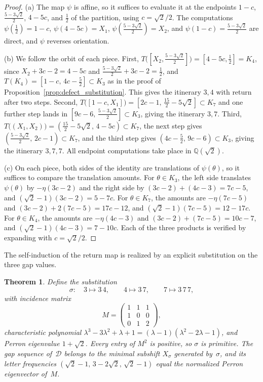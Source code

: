 \documentclass{birkjour}
\newtheorem{theorem}{Theorem}
\theoremstyle{definition}
\theoremstyle{remark}
\begin{document}
\begin{proof}
(a) The map $\psi$ is affine, so it suffices to evaluate it
at the endpoints $1-c$, $\tfrac{5-3\sqrt{2}}{2}$, $4-5c$,
and $\tfrac{1}{2}$ of the partition, using $c=\sqrt{2}/2$.
The computations
$\psi(\tfrac12)=1-c$, $\psi(4-5c)=X_{1}$,
$\psi(\tfrac{5-3\sqrt{2}}{2})=X_{2}$, and
$\psi(1-c)=\tfrac{5-3\sqrt{2}}{2}$
are direct, and $\psi$ reverses orientation.

(b) We follow the orbit of each piece. First,
$T\bigl([X_{2},\tfrac{5-3\sqrt{2}}{2}]\bigr)
=[4-5c,\tfrac12]=K_{4}$, since
$X_{2}+3c-2=4-5c$ and $\tfrac{5-3\sqrt{2}}{2}+3c-2=\tfrac12$,
and $T(K_{4})=[1-c,\,4c-\tfrac52]\subset K_{3}$ as in the
proof of Proposition~\ref{prop:defect_substitution}. This
gives the itinerary $3,4$ with return after two steps.
Second,
$T\bigl([1{-}c,X_{1}]\bigr)=[2c-1,\,\tfrac{15}{2}-5\sqrt{2}]
\subset K_{7}$ and one further step lands in
$[9c-6,\,\tfrac{5-3\sqrt{2}}{2}]\subset K_{3}$, giving the
itinerary $3,7$. Third,
$T\bigl((X_{1},X_{2})\bigr)
=(\tfrac{15}{2}-5\sqrt{2},\,4-5c)\subset K_{7}$, the next
step gives $(\tfrac{5-3\sqrt{2}}{2},\,2c-1)\subset K_{7}$,
and the third step gives
$(4c-\tfrac52,\,9c-6)\subset K_{3}$, giving the itinerary
$3,7,7$. All endpoint computations take place in
$\mathbb{Q}(\sqrt{2})$.

(c) On each piece, both sides of the identity are
translations of $\psi(\theta)$, so it suffices to compare
the translation amounts. For $\theta\in K_{3}$, the left
side translates $\psi(\theta)$ by $-\eta(3c-2)$ and the
right side by $(3c-2)+(4c-3)=7c-5$, and
$(\sqrt{2}-1)(3c-2)=5-7c$. For $\theta\in K_{7}$, the
amounts are $-\eta(7c-5)$ and $(3c-2)+2(7c-5)=17c-12$,
and $(\sqrt{2}-1)(7c-5)=12-17c$. For $\theta\in K_{4}$, the
amounts are $-\eta(4c-3)$ and $(3c-2)+(7c-5)=10c-7$, and
$(\sqrt{2}-1)(4c-3)=7-10c$. Each of the three products is
verified by expanding with $c=\sqrt{2}/2$.
\end{proof}

The self-induction of the return map is realized by an
explicit substitution on the three gap values.

\begin{theorem}\label{thm:defect_subst}
Define the substitution
\begin{equation}\label{eq:sigma}
  \sigma\colon\quad
  3\mapsto 3\,4,\qquad
  4\mapsto 3\,7,\qquad
  7\mapsto 3\,7\,7,
\end{equation}
with incidence matrix
\[
  M=\begin{pmatrix}
  1 & 1 & 1\\
  1 & 0 & 0\\
  0 & 1 & 2
  \end{pmatrix},
\]
characteristic polynomial
$\lambda^{3}-3\lambda^{2}+\lambda+1
=(\lambda-1)(\lambda^{2}-2\lambda-1)$, and Perron eigenvalue
$1+\sqrt{2}$. Every entry of $M^{2}$ is positive, so
$\sigma$ is primitive. The gap sequence of~$\mathcal{D}$
belongs to the minimal subshift $X_{\sigma}$ generated
by~$\sigma$, and its letter frequencies
$(\sqrt{2}-1,\,3-2\sqrt{2},\,\sqrt{2}-1)$ equal the
normalized Perron eigenvector of~$M$.
\end{theorem}
\end{document}
